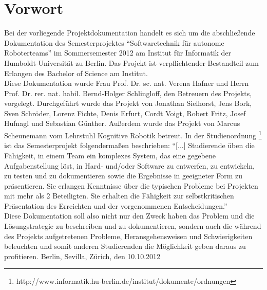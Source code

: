 \chapter{Vorwort}\label{Vorwort}

Bei der vorliegende Projektdokumentation handelt es sich um die abschließende Dokumentation des Semesterprojektes ``Softwaretechnik für autonome Roboterteams'' im Sommersemester 2012 am Institut für Informatik der Humboldt-Universität zu Berlin. Das Projekt ist verpflichtender Bestandteil zum Erlangen des Bachelor of Science am Institut.\\
Diese Dokumentation wurde Frau Prof. Dr. sc. nat. Verena Hafner und Herrn Prof. Dr. rer. nat. habil. Bernd-Holger Schlingloff, den Betreuern des Projekts, vorgelegt. Durchgeführt wurde das Projekt von Jonathan Sielhorst, Jens Bork, Sven Schröder, Lorenz Fichte, Denis Erfurt, Cordt Voigt, Robert Fritz, Josef Hufnagl und Sebastian Günther. Außerdem wurde das Projekt von Marcus Scheunemann vom Lehrstuhl Kognitive Robotik betreut.
In der Studienordnung \footnote{http://www.informatik.hu-berlin.de/institut/dokumente/ordnungen} ist das Semesterprojekt folgendermaßen beschrieben: ``[...] Studierende üben die Fähigkeit, in einem Team ein komplexes System, das eine gegebene Aufgabenstellung löst, in Hard- und/oder Software zu entwerfen, zu entwickeln, zu testen und zu dokumentieren sowie die Ergebnisse in geeigneter Form zu präsentieren. Sie erlangen Kenntnisse über die typischen Probleme bei Projekten mit mehr als 2 Beteiligten. Sie erhalten die Fähigkeit zur selbstkritischen Präsentation des Erreichten und der vorgenommenen Entscheidungen.''\\
Diese Dokumentation soll also nicht nur den Zweck haben das Problem und die Lösungstrategie zu beschreiben und zu  dokumentieren, sondern auch die während des Projekts aufgetretenen Probleme, Heransgehensweisen und Schwierigkeiten beleuchten und somit anderen Studierenden die Möglichkeit geben daraus zu profitieren.
Berlin, Sevilla, Zürich, den 10.10.2012
